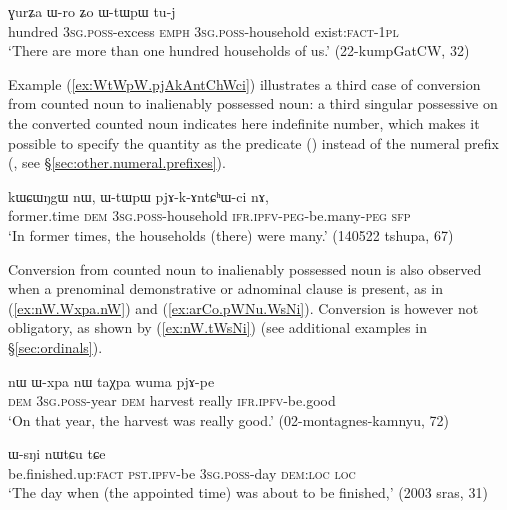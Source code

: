 \begin{exe}
\ex \label{ex:GurZa.Wro.WtWpW}
\gll ɣurʑa ɯ-ro ʑo ɯ-tɯpɯ tu-j \\
 hundred \textsc{3sg}.\textsc{poss}-excess \textsc{emph} \textsc{3sg}.\textsc{poss}-household exist:\textsc{fact}-\textsc{1pl} \\
\glt `There are more than one hundred households of us.' (22-kumpGatCW, 32)
\end{exe}

Example (\ref{ex:WtWpW.pjAkAntChWci}) illustrates a third case of conversion from counted noun to inalienably possessed noun: a third singular possessive on the converted counted noun indicates here indefinite number, which makes it possible to specify the quantity as the predicate () instead of the numeral prefix (, see §\ref{sec:other.numeral.prefixes}).

\begin{exe}
\ex \label{ex:WtWpW.pjAkAntChWci}
\gll kɯɕɯŋgɯ nɯ, ɯ-tɯpɯ pjɤ-k-ɤntɕʰɯ-ci nɤ, \\
 former.time \textsc{dem} \textsc{3sg}.\textsc{poss}-household \textsc{ifr}.\textsc{ipfv}-\textsc{peg}-be.many-\textsc{peg} \textsc{sfp} \\
\glt `In former times, the households (there) were many.' (140522 tshupa, 67)
\end{exe}

Conversion from counted noun to inalienably possessed noun is also observed when a prenominal demonstrative or adnominal clause is present, as in (\ref{ex:nW.Wxpa.nW}) and (\ref{ex:arCo.pWNu.WsNi}). Conversion is however not obligatory, as shown by (\ref{ex:nW.tWsNi}) (see additional examples in §\ref{sec:ordinals}).

\begin{exe}
\ex \label{ex:nW.Wxpa.nW}
\gll nɯ ɯ-xpa nɯ taχpa wuma pjɤ-pe \\
\textsc{dem} \textsc{3sg}.\textsc{poss}-year \textsc{dem} harvest really \textsc{ifr}.\textsc{ipfv}-be.good \\
\glt `On that year, the harvest was really good.' (02-montagnes-kamnyu, 72)
\end{exe}

\begin{exe}
\ex \label{ex:arCo.pWNu.WsNi}
\gll [arɕo pɯ-ŋu] ɯ-sŋi nɯtɕu tɕe \\
be.finished.up:\textsc{fact} \textsc{pst}.\textsc{ipfv}-be \textsc{3sg}.\textsc{poss}-day \textsc{dem}:\textsc{loc} \textsc{loc} \\
\glt `The day when (the appointed time) was about to be finished,' (2003 sras, 31)
 \end{exe}
 
